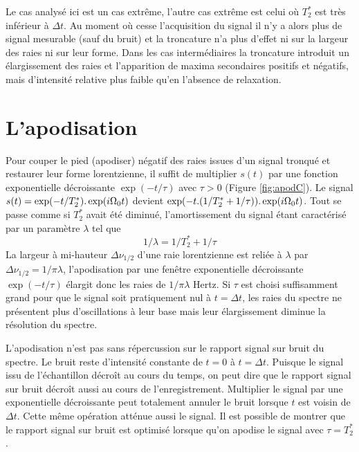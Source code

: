 Le cas analysé ici est un cas extrême, l'autre cas extrême est celui où $T_2^*$ est très 
inférieur à $\Delta t$. 
Au moment où cesse l'acquisition du signal il n'y a alors plus de signal 
mesurable (sauf du bruit) et la troncature n'a plus d'effet ni sur la largeur des raies ni sur 
leur forme. 
Dans les cas intermédiaires la troncature introduit un élargissement des raies 
et l'apparition de maxima secondaires positifs et négatifs, mais d'intensité relative plus 
faible qu'en l'absence de relaxation.

\section{L'apodisation}
Pour couper le pied (apodiser) négatif des raies issues d'un signal tronqué et restaurer leur 
forme lorentzienne, il suffit de multiplier $s(t)$ par une fonction exponentielle 
décroissante $\exp(-t/\tau)$ avec $\tau > 0$ (Figure \ref{fig:apodC}).
Le signal $s(t) = \exp(-t/T_2^*).\exp(i \Omega_0 t)$ devient 
$\exp(-t.(1/T_2^* + 1/\tau)).\exp(i \Omega_0 t)$. 
Tout se passe comme si $T_2^*$ avait été diminué, l'amortissement du 
signal étant caractérisé par un paramètre $\lambda$ tel que 
\begin{equation}
1/\lambda = 1/T_2^* + 1/\tau
\end{equation}
La largeur à mi-hauteur $\Delta\nu_{1/2}$ d'une raie lorentzienne est reliée à 
$\lambda$ par $\Delta\nu_{1/2} = 1/\pi\lambda$, 
l'apodisation par une fenêtre exponentielle décroissante $\exp(-t/\tau)$ élargit donc les raies 
de $1/\pi\lambda$ Hertz. 
Si $\tau$ est choisi suffisamment grand pour que le signal soit pratiquement 
nul à $t = \Delta t$, les raies du spectre ne présentent plus d'oscillations à leur base mais leur 
élargissement diminue la résolution du spectre.

L'apodisation n'est pas sans répercussion sur le rapport signal sur bruit du spectre.
Le bruit reste d'intensité constante de $t=0$ à $t=\Delta t$.
Puisque le signal issu de l'échantillon décroît au cours du temps, on peut
dire que le rapport signal sur bruit décroît aussi au cours de l'enregistrement.
Multiplier le signal par une exponentielle décroissante peut totalement
annuler le bruit lorsque $t$ est voisin de $\Delta t$.
Cette même opération atténue aussi le signal.
Il est possible de montrer que le rapport signal sur bruit est optimisé
lorsque qu'on apodise le signal avec $\tau = T_2^*$.

